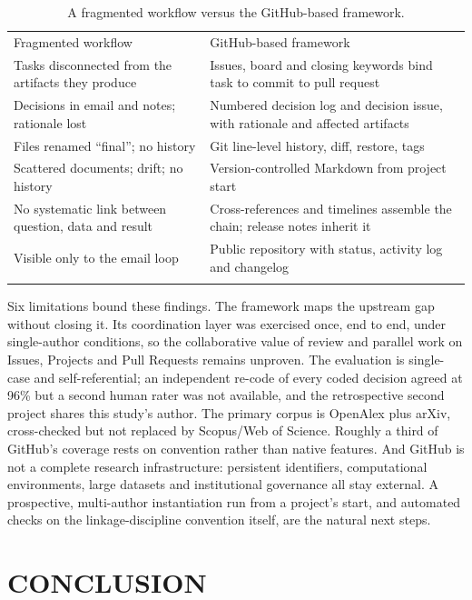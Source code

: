 \documentclass{IEEEcsmag}
\begin{document}
\begin{table}[t]
\caption{A fragmented workflow versus the GitHub-based framework.}\label{tab:comparison}
\tablefont
\begin{tabular*}{17.5pc}{@{}p{68pt}<{\raggedright}p{115pt}<{\raggedright}@{}}
\toprule
Fragmented workflow& GitHub-based framework\\
\colrule
Tasks disconnected from the artifacts they produce& Issues, board and closing keywords bind task to commit to pull request\\[3pt]
Decisions in email and notes; rationale lost& Numbered decision log and decision issue, with rationale and affected artifacts\\[3pt]
Files renamed ``final''; no history& Git line-level history, diff, restore, tags\\[3pt]
Scattered documents; drift; no history& Version-controlled Markdown from project start\\[3pt]
No systematic link between question, data and result& Cross-references and timelines assemble the chain; release notes inherit it\\[3pt]
Visible only to the email loop& Public repository with status, activity log and changelog\\
\botrule
\end{tabular*}
\end{table}

Six limitations bound these findings. The framework maps the upstream gap without closing it. Its coordination layer was exercised once, end to end, under single-author conditions, so the collaborative value of review and parallel work on Issues, Projects and Pull Requests remains unproven. The evaluation is single-case and self-referential; an independent re-code of every coded decision agreed at 96\% but a second human rater was not available, and the retrospective second project shares this study's author. The primary corpus is OpenAlex plus arXiv, cross-checked but not replaced by Scopus/Web of Science. Roughly a third of GitHub's coverage rests on convention rather than native features. And GitHub is not a complete research infrastructure: persistent identifiers, computational environments, large datasets and institutional governance all stay external. A prospective, multi-author instantiation run from a project's start, and automated checks on the linkage-discipline convention itself, are the natural next steps.

\section{CONCLUSION}
\end{document}
